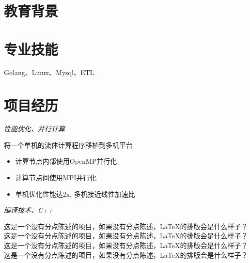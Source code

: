 \documentclass{uniquecv}
\begin{document}

\medskip




\section{教育背景}



\section{专业技能}
\smallskip
Golang、Linux、Mysql、ETL




\section{项目经历}


\textit{性能优化、并行计算}
\vspace{0.4ex}

将一个单机的流体计算程序移植到多机平台
\begin{itemize}
  \item 计算节点内部使用OpenMP并行化
  \item 计算节点间使用MPI并行化
  \item 单机优化性能达2x, 多机接近线性加速比
\end{itemize}

\textit{编译技术、C++}
\vspace{0.4ex}

这是一个没有分点陈述的项目，如果没有分点陈述，LaTeX的排版会是什么样子？
这是一个没有分点陈述的项目，如果没有分点陈述，LaTeX的排版会是什么样子？
这是一个没有分点陈述的项目，如果没有分点陈述，LaTeX的排版会是什么样子？
这是一个没有分点陈述的项目，如果没有分点陈述，LaTeX的排版会是什么样子？
\end{document}
